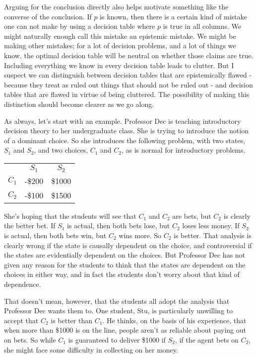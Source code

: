 \documentclass[11pt,]{book}
\def\toprule{}
\def\bottomrule{}
\begin{document}
Arguing for the conclusion directly also helps motivate something like the converse of the conclusion. If \(p\) is known, then there is a certain kind of mistake one can not make by using a decision table where \(p\) is true in all columns. We might naturally enough call this mistake an epistemic mistake. We might be making other mistakes; for a lot of decision problems, and a lot of things we know, the optimal decision table will be neutral on whether those claims are true. Including everything we know in every decision table leads to clutter. But I suspect we can distinguish between decision tables that are epistemically flawed - because they treat as ruled out things that should not be ruled out - and decision tables that are flawed in virtue of being cluttered. The possibility of making this distinction should become clearer as we go along.

As always, let's start with an example. Professor Dec is teaching introductory decision theory to her undergraduate class. She is trying to introduce the notion of a dominant choice. So she introduces the following problem, with two states, \(S_1\) and \(S_2\), and two choices, \(C_1\) and \(C_2\), as is normal for introductory problems.

\begin{longtable}[]{@{}lcc@{}}
\toprule
\endhead
& \(S_1\) & \(S_2\)\tabularnewline
\(C_1\) & -\$200 & \$1000\tabularnewline
\(C_2\) & -\$100 & \$1500\tabularnewline
\bottomrule
\end{longtable}

She's hoping that the students will see that \(C_1\) and \(C_2\) are bets, but \(C_2\) is clearly the better bet. If \(S_1\) is actual, then both bets lose, but \(C_2\) loses less money. If \(S_2\) is actual, then both bets win, but \(C_2\) wins more. So \(C_2\) is better. That analysis is clearly wrong if the state is causally dependent on the choice, and controversial if the states are evidentially dependent on the choices. But Professor Dec has not given any reason for the students to think that the states are dependent on the choices in either way, and in fact the students don't worry about that kind of dependence.

That doesn't mean, however, that the students all adopt the analysis that Professor Dec wants them to. One student, Stu, is particularly unwilling to accept that \(C_2\) is better than \(C_1\). He thinks, on the basis of his experience, that when more than \$1000 is on the line,
people aren't as reliable about paying out on bets. So while \(C_1\) is guaranteed to deliver \$1000 if \(S_2\), if the agent bets on \(C_2\), she might face some difficulty in collecting on her money.
\end{document}
